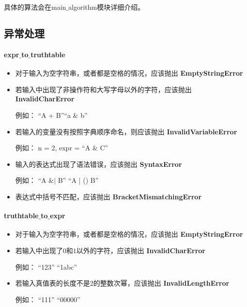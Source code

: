 	具体的算法会在main$\_$algorithm模块详细介绍。

\subsection{异常处理}

\paragraph{expr$\_$to$\_$truthtable\\}
	\begin{itemize}
		\item	对于输入为空字符串，或者都是空格的情况，应该抛出
			\textbf{EmptyStringError}
		\item	若输入中出现了非操作符和大写字母以外的字符，应该抛出
			\textbf{InvalidCharError}
			
			例如：	“A + B”\quad	 “a $\&$ b” 
		\item	若输入的变量没有按照字典顺序命名，则应该抛出
			\textbf{InvalidVariableError}
			
			例如：	n = 2, expr = “A $\&$ C”
		
		\item	输入的表达式出现了语法错误，应该抛出
			\textbf{SyntaxError}
			
			例如：	“A $\& |$ B” \quad	“A | () B” 
			
		\item	表达式中括号不匹配，应该抛出
			\textbf{BracketMismatchingError}
	\end{itemize}
\paragraph{truthtable$\_$to$\_$expr\\}
	\begin{itemize}
		\item	对于输入为空字符串，或者都是空格的情况，应该抛出
			\textbf{EmptyStringError}
		\item	若输入中出现了$0$和$1$以外的字符，应该抛出
			\textbf{InvalidCharError}
			
			例如：	“123”	\quad	“1abc” 
		\item	若输入真值表的长度不是2的整数次幂，应该抛出
			\textbf{InvalidLengthError}
			
			例如：	“111”	\quad	“00000” 	
	\end{itemize}
